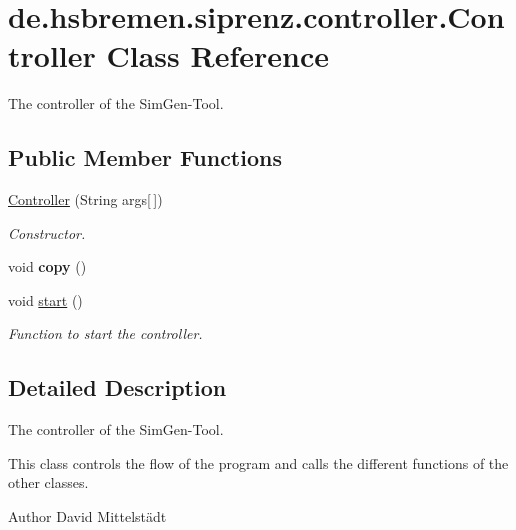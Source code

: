 \hypertarget{classde_1_1hsbremen_1_1siprenz_1_1controller_1_1Controller}{}\section{de.\+hsbremen.\+siprenz.\+controller.\+Controller Class Reference}
\label{classde_1_1hsbremen_1_1siprenz_1_1controller_1_1Controller}


The controller of the Sim\+Gen-\/\+Tool.  


\subsection*{Public Member Functions}
\begin{DoxyCompactItemize}
\item 
\hyperlink{classde_1_1hsbremen_1_1siprenz_1_1controller_1_1Controller_a79d6ea7bfe78c9ffff28c4e52eadab75}{Controller} (String args\mbox{[}$\,$\mbox{]})
\begin{DoxyCompactList}\small\item\em Constructor. \end{DoxyCompactList}\item 
void {\bfseries copy} ()\hypertarget{classde_1_1hsbremen_1_1siprenz_1_1controller_1_1Controller_a0f28a729a0d15adebaf8ca6e52e181cb}{}\label{classde_1_1hsbremen_1_1siprenz_1_1controller_1_1Controller_a0f28a729a0d15adebaf8ca6e52e181cb}

\item 
void \hyperlink{classde_1_1hsbremen_1_1siprenz_1_1controller_1_1Controller_aaa3798b73eec3e58ce26f944a9deaba5}{start} ()
\begin{DoxyCompactList}\small\item\em Function to start the controller. \end{DoxyCompactList}\end{DoxyCompactItemize}


\subsection{Detailed Description}
The controller of the Sim\+Gen-\/\+Tool. 

This class controls the flow of the program and calls the different functions of the other classes.

\begin{DoxyAuthor}{Author}
David Mittelstädt 
\end{DoxyAuthor}


